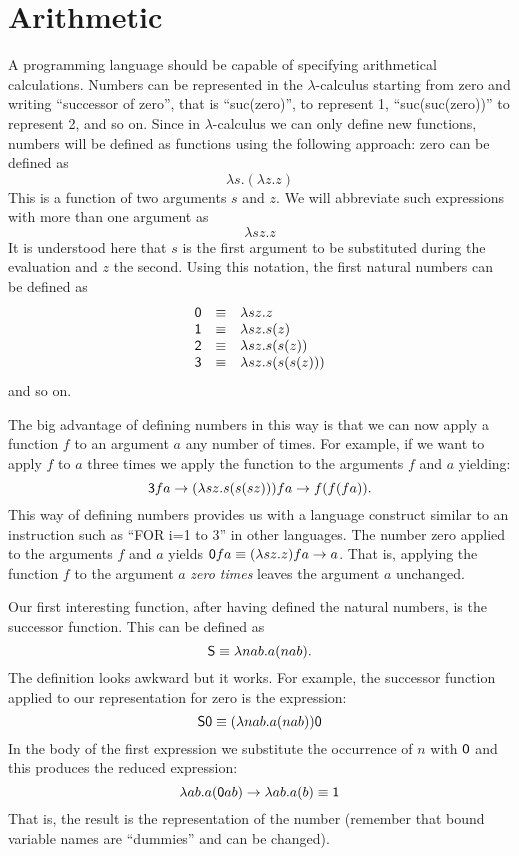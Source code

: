 \section{Arithmetic}
A programming language should be capable of specifying arithmetical calculations. Numbers can be represented in the $\lambda$-calculus starting from zero and writing ``successor of zero'', that is ``suc(zero)'', to represent 1, ``suc(suc(zero))'' to represent 2, and so on. Since in $\lambda$-calculus we can only define new functions, numbers will be defined as functions using the following approach: zero can be defined as $$\lambda s.(\lambda z.z)$$ This is a function of two arguments $s$ and $z$. We will abbreviate such expressions with more than one argument as $$\lambda sz.z$$ It is understood here that $s$ is the first argument to be substituted during the evaluation and $z$ the second. Using this notation, the first natural numbers can be defined as 
\[
\begin{array}{ccl}
{\sf 0} &\equiv& \lambda sz.z\\
{\sf 1} &\equiv& \lambda sz.s(z)\\
{\sf 2} &\equiv & \lambda s z.s(s(z))\\
{\sf 3} &\equiv&  \lambda s z.s (s(s(z)))
\end{array}
\]
and so on.

The big advantage of defining numbers in this way is that we can now apply a function $f$ to an argument $a$ any number of times. For example, if we want to apply $f$ to $a$ three times we apply the function {} to the arguments $f$ and $a$ yielding:
$$
{\sf 3}fa \rightarrow  (\lambda sz. s(s(sz)))fa \rightarrow f(f(fa)).
$$
This way of defining numbers provides us with a language construct similar to an instruction such as ``FOR i=1 to 3'' in other languages. The number zero applied to the arguments $f$ and $a$ yields ${\sf 0}fa \equiv (\lambda sz.z)fa \rightarrow a$. That is, applying the function $f$ to the argument $a$ {\em zero times} leaves the argument $a$ unchanged.

Our first interesting function, after having defined the natural numbers, is the successor function. This can be defined as 
$${\sf S}\equiv\lambda nab.a(nab).$$
The definition looks awkward but it works. For example, 
the successor function applied to our representation for zero is the expression:
$${\sf S0}\equiv (\lambda nab.a(nab)){\sf 0}$$ 
In the body of the first expression we substitute the occurrence of $n$ with ${\sf 0}$ and this produces the reduced expression:
$$\lambda ab.a({\sf 0}ab) \rightarrow \lambda ab.a(b)\equiv {\sf 1}$$
That is, the result is the representation of the number {}  (remember that bound variable names are ``dummies'' and can be changed). 

